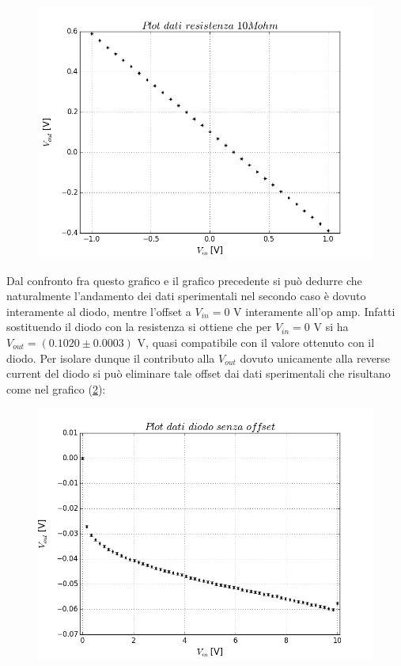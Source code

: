 \documentclass[journal, a4paper]{IEEEtran}
\begin{document}
\begin{figure}[htp]
\caption{}
\label{plotdiodores}
\centering
\includegraphics[scale=.35]{plotdiodores}
\end{figure}

Dal confronto fra questo grafico e il grafico precedente si può dedurre che naturalmente l'andamento dei dati sperimentali nel secondo caso è dovuto interamente al diodo, mentre l'offset a $V_{in} = 0$ V interamente all'op amp. Infatti sostituendo il diodo con la resistenza si ottiene che per $V_{in} = 0$ V si ha $V_{out} = (0.1020 \pm 0.0003)$ V, quasi compatibile con il valore ottenuto con il diodo. Per isolare dunque il contributo alla $V_{out}$ dovuto unicamente alla reverse current del diodo si può eliminare tale offset dai dati sperimentali che risultano come nel grafico (\ref{plotdiodo_no_offset}):

\begin{figure}[htp]
\caption{}
\label{plotdiodo_no_offset}
\centering
\includegraphics[scale=.35]{plotdiodo_no_offset}
\end{figure}
\end{document}
